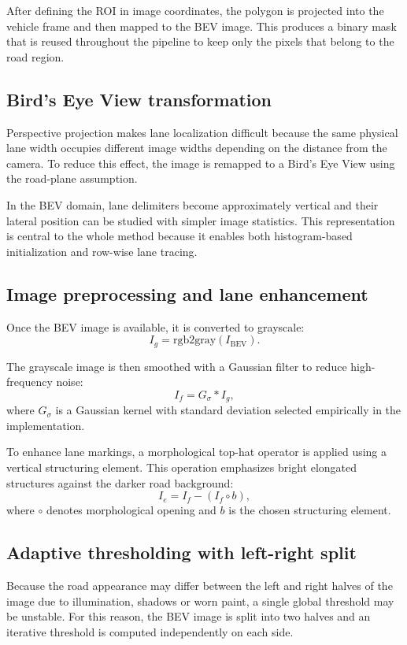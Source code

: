 \documentclass[conference]{IEEEtran}
\begin{document}
After defining the ROI in image coordinates, the polygon is projected into the vehicle frame and then mapped to the BEV image. This produces a binary mask that is reused throughout the pipeline to keep only the pixels that belong to the road region.

\subsection{Bird's Eye View transformation}
Perspective projection makes lane localization difficult because the same physical lane width occupies different image widths depending on the distance from the camera. To reduce this effect, the image is remapped to a Bird's Eye View using the road-plane assumption.

In the BEV domain, lane delimiters become approximately vertical and their lateral position can be studied with simpler image statistics. This representation is central to the whole method because it enables both histogram-based initialization and row-wise lane tracing.

\subsection{Image preprocessing and lane enhancement}
Once the BEV image is available, it is converted to grayscale:
\begin{equation}
I_g = \mathrm{rgb2gray}(I_{\text{BEV}}).
\end{equation}

The grayscale image is then smoothed with a Gaussian filter to reduce high-frequency noise:
\begin{equation}
I_f = G_\sigma * I_g,
\end{equation}
where $G_\sigma$ is a Gaussian kernel with standard deviation selected empirically in the implementation.

To enhance lane markings, a morphological top-hat operator is applied using a vertical structuring element. This operation emphasizes bright elongated structures against the darker road background:
\begin{equation}
I_e = I_f - (I_f \circ b),
\end{equation}
where $\circ$ denotes morphological opening and $b$ is the chosen structuring element.

\subsection{Adaptive thresholding with left-right split}
Because the road appearance may differ between the left and right halves of the image due to illumination, shadows or worn paint, a single global threshold may be unstable. For this reason, the BEV image is split into two halves and an iterative threshold is computed independently on each side.
\end{document}
